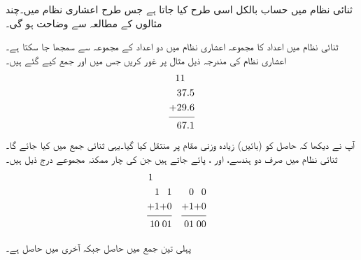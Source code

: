	ثنائی نظام میں حساب بالکل اسی طرح کیا جاتا ہے جس طرح اعشاری نظام میں۔چند مثالوں کے مطالعہ سے وضاحت ہو گی۔
	
	ثنائی نظام میں اعداد کا مجموعہ اعشاری نظام میں دو اعداد کے مجموعہ سے سمجھا جا سکتا ہے۔اعشاری نظام کی مندرجہ ذیل مثال پر غور کریں جس میں  اور  جمع کیے گئے ہیں۔
\begin{align*}
\begin{split}
11\phantom{.1\,}&\\
37.5&\\
+29.6&\\
\noalign{\smallskip}\hline\noalign{\smallskip}
67.1&
\end{split}
\end{align*}
آپ نے دیکھا کہ حاصل کو (بائیں) زیادہ وزنی مقام پر منتقل کیا گیا۔یہی ثنائی جمع میں کیا جائے گا۔ ثنائی نظام میں صرف دو ہندسے،  اور ، پائے جاتے ہیں جن کی چار ممکنہ مجموعے درج ذیل ہیں۔
\begin{align*}
\begin{split}
1\phantom{1\,}&\\
1&\\
+1&\\
\noalign{\smallskip}\hline\noalign{\smallskip}
10&
\end{split}&
\begin{split}
&\\
&1\\
+&0\\
\noalign{\smallskip}\hline\noalign{\smallskip}
0&1
\end{split}&
\begin{split}
&\\
&0\\
+&1\\
\noalign{\smallskip}\hline\noalign{\smallskip}
0&1
\end{split}&
\begin{split}
&\\
&0\\
+&0\\
\noalign{\smallskip}\hline\noalign{\smallskip}
0&0
\end{split}
\end{align*}


پہلی تین جمع میں حاصل  جبکہ آخری میں حاصل  ہے۔


